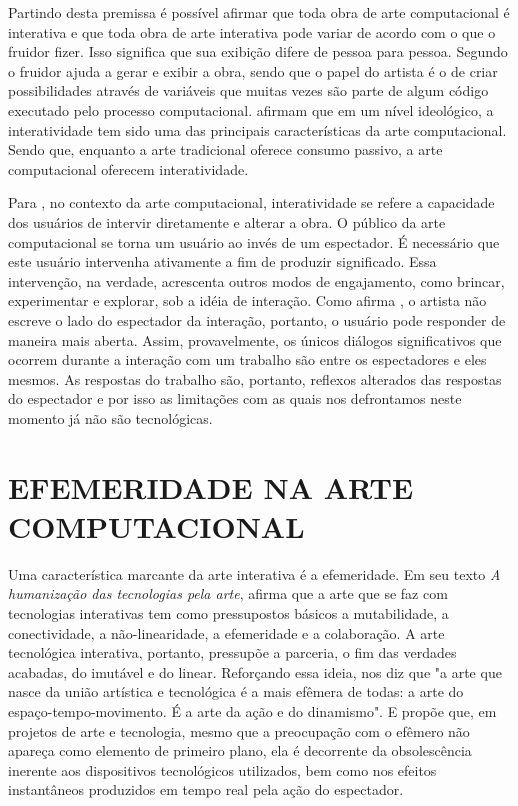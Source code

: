 Partindo desta premissa é possível afirmar que toda obra de arte computacional é interativa e que toda obra de arte interativa pode variar de acordo com o que o fruidor fizer. Isso significa que sua exibição difere de pessoa para pessoa. Segundo  o fruidor ajuda a gerar e exibir a obra, sendo que o papel do artista é o de criar possibilidades através de variáveis que muitas vezes são parte de algum código executado pelo processo computacional.  afirmam que em um nível ideológico, a interatividade tem sido uma das principais características da arte computacional. Sendo que, enquanto a arte tradicional oferece consumo passivo, a arte computacional oferecem interatividade.

Para , no contexto da arte computacional, interatividade se refere a capacidade dos usuários de intervir diretamente e alterar a obra. O público da arte computacional se torna um usuário ao invés de um espectador. É necessário que este usuário intervenha ativamente a fim de produzir significado. Essa intervenção, na verdade, acrescenta outros modos de engajamento, como brincar, experimentar e explorar, sob a idéia de interação. Como afirma , o artista não escreve o lado do espectador da interação, portanto, o usuário pode responder de maneira mais aberta. Assim, provavelmente, os únicos diálogos significativos que ocorrem durante a interação com um trabalho são entre os espectadores e eles mesmos. As respostas do trabalho são, portanto, reflexos alterados das respostas do espectador e por isso as limitações com as quais nos defrontamos neste momento já não são tecnológicas.


\section{EFEMERIDADE NA ARTE COMPUTACIONAL}

Uma característica marcante da arte interativa é a efemeridade. Em seu texto \textit{A humanização das tecnologias pela arte},  afirma que a arte que se faz com tecnologias interativas tem como pressupostos básicos a mutabilidade, a conectividade, a não-linearidade, a efemeridade e a colaboração. A arte tecnológica interativa, portanto, pressupõe a parceria, o fim das verdades acabadas, do imutável e do linear. Reforçando essa ideia,  nos diz que "a arte que nasce da união artística e tecnológica é a mais efêmera de todas: a arte do espaço-tempo-movimento. É a arte da ação e do dinamismo". E  propõe que, em projetos de arte e tecnologia, mesmo que a preocupação com o efêmero não apareça como elemento de primeiro plano, ela é decorrente da obsolescência inerente aos dispositivos tecnológicos utilizados, bem como nos efeitos instantâneos produzidos em tempo real pela ação do espectador.

